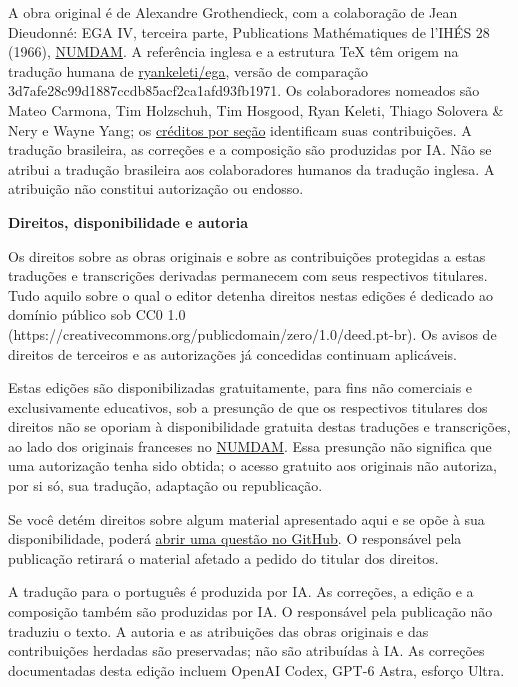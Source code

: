 A obra original é de Alexandre Grothendieck, com a colaboração de Jean Dieudonné: EGA IV, terceira parte, Publications Mathématiques de l’IHÉS 28 (1966), \href{https://numdam.org/item/PMIHES\_1966\_\_28\_\_5\_0/}{NUMDAM}. A referência inglesa e a estrutura TeX têm origem na tradução humana de \href{https://github.com/ryankeleti/ega/tree/3d7afe28c99d1887ccdb85acf2ca1afd93fb1971}{ryankeleti/ega}, versão de comparação 3d7afe28c99d1887ccdb85acf2ca1afd93fb1971. Os colaboradores nomeados são Mateo Carmona, Tim Holzschuh, Tim Hosgood, Ryan Keleti, Thiago Solovera \& Nery e Wayne Yang; os \href{https://github.com/ryankeleti/ega/blob/3d7afe28c99d1887ccdb85acf2ca1afd93fb1971/README.md}{créditos por seção} identificam suas contribuições. A tradução brasileira, as correções e a composição são produzidas por IA. Não se atribui a tradução brasileira aos colaboradores humanos da tradução inglesa. A atribuição não constitui autorização ou endosso.

\noindent\textbf{Direitos, disponibilidade e autoria}

Os direitos sobre as obras originais e sobre as contribuições protegidas a estas traduções e transcrições derivadas permanecem com seus respectivos titulares. Tudo aquilo sobre o qual o editor detenha direitos nestas edições é dedicado ao domínio público sob CC0 1.0 (https://creativecommons.org/publicdomain/zero/1.0/deed.pt-br). Os avisos de direitos de terceiros e as autorizações já concedidas continuam aplicáveis.

Estas edições são disponibilizadas gratuitamente, para fins não comerciais e exclusivamente educativos, sob a presunção de que os respectivos titulares dos direitos não se oporiam à disponibilidade gratuita destas traduções e transcrições, ao lado dos originais franceses no \href{https://www.numdam.org/}{NUMDAM}. Essa presunção não significa que uma autorização tenha sido obtida; o acesso gratuito aos originais não autoriza, por si só, sua tradução, adaptação ou republicação.

Se você detém direitos sobre algum material apresentado aqui e se opõe à sua disponibilidade, poderá \href{https://github.com/KokunoYumeto/ega-fga-sga-pt-br/issues}{abrir uma questão no GitHub}. O responsável pela publicação retirará o material afetado a pedido do titular dos direitos.

A tradução para o português é produzida por IA. As correções, a edição e a composição também são produzidas por IA. O responsável pela publicação não traduziu o texto. A autoria e as atribuições das obras originais e das contribuições herdadas são preservadas; não são atribuídas à IA. As correções documentadas desta edição incluem OpenAI Codex, GPT-6 Astra, esforço Ultra.
\par\endgroup

\clearpage
